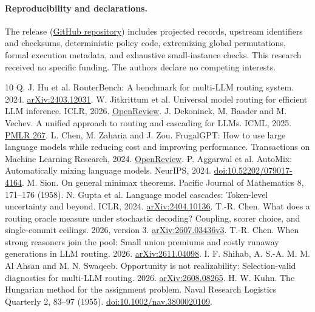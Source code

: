 \documentclass[11pt]{article}
\begin{document}
\paragraph{Reproducibility and declarations.} The release (\href{https://github.com/fightforbelief/p11-cascade-replay}{GitHub repository}) includes projected records, upstream identifiers and checksums, deterministic policy code, extremizing global permutations, formal execution metadata, and exhaustive small-instance checks. This research received no specific funding. The authors declare no competing interests.
\begingroup\small
\begin{thebibliography}{10}
\setlength{\itemsep}{2pt}
 Q. J. Hu et al. RouterBench: A benchmark for multi-LLM routing system. 2024. \href{https://arxiv.org/abs/2403.12031}{arXiv:2403.12031}.
 W. Jitkrittum et al. Universal model routing for efficient LLM inference. ICLR, 2026. \href{https://openreview.net/forum?id=ka82fvJ5f1}{OpenReview}.
 J. Dekoninck, M. Baader and M. Vechev. A unified approach to routing and cascading for LLMs. ICML, 2025. \href{https://proceedings.mlr.press/v267/dekoninck25a.html}{PMLR 267}.
 L. Chen, M. Zaharia and J. Zou. FrugalGPT: How to use large language models while reducing cost and improving performance. Transactions on Machine Learning Research, 2024. \href{https://openreview.net/forum?id=cSimKw5p6R}{OpenReview}.
 P. Aggarwal et al. AutoMix: Automatically mixing language models. NeurIPS, 2024. \href{https://doi.org/10.52202/079017-4164}{doi:10.52202/079017-4164}.
 M. Sion. On general minimax theorems. Pacific Journal of Mathematics 8, 171--176 (1958).
 N. Gupta et al. Language model cascades: Token-level uncertainty and beyond. ICLR, 2024. \href{https://arxiv.org/abs/2404.10136}{arXiv:2404.10136}.
 T.-R. Chen. What does a routing oracle measure under stochastic decoding? Coupling, scorer choice, and single-commit ceilings. 2026, version 3. \href{https://arxiv.org/abs/2607.03436v3}{arXiv:2607.03436v3}.
 T.-R. Chen. When strong reasoners join the pool: Small union premiums and costly runaway generations in LLM routing. 2026. \href{https://arxiv.org/abs/2611.04098}{arXiv:2611.04098}.
 I. F. Shihab, A. S.-A. M. M. Al Ahsan and M. N. Swaqeeb. Opportunity is not realizability: Selection-valid diagnostics for multi-LLM routing. 2026. \href{https://arxiv.org/abs/2608.08265}{arXiv:2608.08265}.
 H. W. Kuhn. The Hungarian method for the assignment problem. Naval Research Logistics Quarterly 2, 83--97 (1955). \href{https://doi.org/10.1002/nav.3800020109}{doi:10.1002/nav.3800020109}.

\end{thebibliography}
\end{document}
